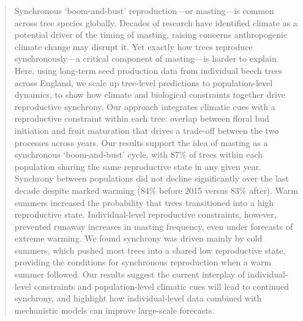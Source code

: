 \documentclass[11pt]{article}
\begin{document}
\begin{abstract}
Synchronous `boom-and-bust' reproduction---or masting---is common across tree species globally. %
Decades of research have identified climate as a potential driver of the timing of masting, raising concerns anthropogenic climate change may disrupt it. Yet exactly how trees reproduce synchronously---a critical component of masting---is harder to explain. Here, using long-term seed production data from individual beech trees across England, we scale up tree-level predictions to population-level dynamics, to show how climate and biological constraints together drive reproductive synchrony. Our approach integrates climatic cues with a reproductive constraint within each tree: overlap between floral bud initiation and fruit maturation that drives a trade-off between the two processes across years.
Our results support the idea of masting as a synchronous `boom-and-bust' cycle, with 87\% of trees within each population sharing the same reproductive state in any given year. Synchrony between populations did not decline significantly over the last decade despite marked warming (84\% before 2015 versus 83\% after). Warm summers increased the probability that trees transitioned into a high reproductive state. Individual-level reproductive constraints, however, prevented runaway increases in masting frequency, even under forecasts of extreme warming. We found synchrony was driven mainly by cold summers, which pushed most trees into a shared low reproductive state, providing the conditions for synchronous reproduction when a warm summer followed. Our results suggest the current interplay of individual-level constraints and population-level climatic cues will lead to continued synchrony, and highlight how individual-level data combined with mechanistic models can improve large-scale forecasts.   

\end{abstract}
\end{document}
